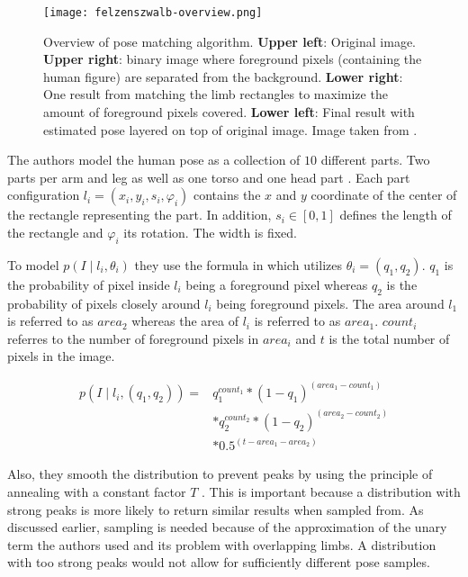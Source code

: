 \begin{figure}[htb!]
    \centering
    \texttt{[image: felzenszwalb-overview.png]}
    \caption{Overview of pose matching algorithm. \textbf{Upper left}: Original image. \textbf{Upper right}: binary image where foreground pixels (containing the human figure) are separated from the background. \textbf{Lower right}: One result from matching the limb rectangles to maximize the amount of foreground pixels covered. \textbf{Lower left}: Final result with estimated pose layered on top of original image. Image taken from \cite{felzenszwalb_pictorial_2005}.}
    \label{fig:felzenszwalb-overview}
\end{figure}

The authors model the human pose as a collection of $10$ different parts. 
Two parts per arm and leg as well as one torso and one head part .
Each part configuration $l_i = (x_i, y_i, s_i , \varphi_i)$ contains the $x$ and $y$ coordinate of the center of the rectangle representing the part.
In addition, $s_i \in [0,1]$ defines the length of the rectangle and $\varphi_i$ its rotation.
The width is fixed.

To model $p(I \mid l_i, \theta_i)$ they use the formula in  which utilizes $\theta_i = (q_1, q_2)$.
$q_1$ is the probability of pixel inside $l_i$ being a foreground pixel whereas $q_2$ is the probability of pixels closely around $l_i$ being foreground pixels.
The area around $l_1$ is referred to as $area_2$ whereas the area of $l_i$ is referred to as $area_1$.
$count_i$ referres to the number of foreground pixels in $area_i$ and $t$ is the total number of pixels in the image.

\begin{equation}
    \label{eq:felz-unary}
    \begin{split}
        p(I \mid l_i, (q_1, q_2)) = &q_1^{count_1} * (1 - q_1)^{(area_1 - count_1)} \\ 
        &* q_2^{count_2} * (1 - q_2)^{(area_2 - count_2)} \\ 
        &* 0.5^{(t - area_1 - area_2)}
    \end{split}
\end{equation}

Also, they smooth the distribution to prevent peaks by using the principle of annealing with a constant factor $T$ .
This is important because a distribution with strong peaks is more likely to return similar results when sampled from.
As discussed earlier, sampling is needed because of the approximation of the unary term the authors used and its problem with overlapping limbs.
A distribution with too strong peaks would not allow for sufficiently different pose samples.

